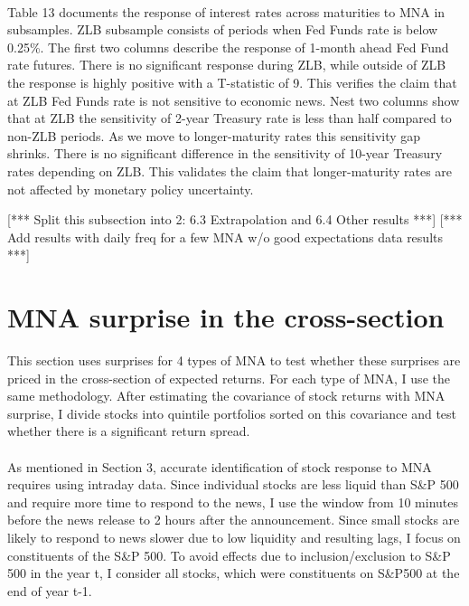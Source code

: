 \documentclass[12pt]{article}
\begin{document}
\paragraph{}
Table 13 documents the response of interest rates across maturities to MNA in subsamples. ZLB subsample consists of periods when Fed Funds rate is below 0.25\%. The first two columns describe the response of 1-month ahead Fed Fund rate futures. There is no significant response during ZLB, while outside of ZLB the response is highly positive with a T-statistic of 9. This verifies the claim that at ZLB Fed Funds rate is not sensitive to economic news. Nest two columns show that at ZLB the sensitivity of 2-year Treasury rate is less than half compared to non-ZLB periods. As we move to longer-maturity rates this sensitivity gap shrinks. There is no significant difference in the sensitivity of 10-year Treasury rates depending on ZLB. This validates the claim that longer-maturity rates are not affected by monetary policy uncertainty.

[*** Split this subsection into 2: 6.3 Extrapolation and 6.4 Other results ***]
[*** Add results with daily freq for a few MNA w/o good expectations data results ***]

\section{MNA surprise in the cross-section} \label{sec:Model}

This section uses surprises for 4 types of MNA to test whether these surprises are priced in the cross-section of expected returns. For each type of MNA, I use the same methodology. After estimating the covariance of stock returns with MNA surprise, I divide stocks into quintile portfolios sorted on this covariance and test whether there is a significant return spread.
\paragraph{}
As mentioned in Section 3, accurate identification of stock response to MNA requires using intraday data. Since individual stocks are less liquid than S\&P 500 and require more time to respond to the news, I use the window from 10 minutes before the news release to 2 hours after the announcement. Since small stocks are likely to respond to news slower due to low liquidity and resulting lags, I focus on constituents of the S\&P 500. To avoid effects due to inclusion/exclusion to S\&P 500 in the year t, I consider all stocks, which were constituents on S\&P500 at the end of year t-1.
\end{document}
